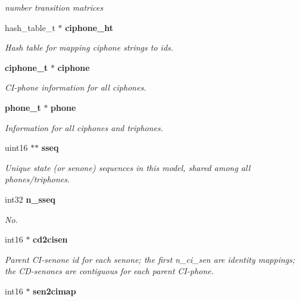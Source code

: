 \begin{DoxyCompactItemize}
\begin{DoxyCompactList}\small\item\em number transition matrices \end{DoxyCompactList}\item 
hash\-\_\-table\-\_\-t $\ast$ {\bf ciphone\-\_\-ht}\label{structmdef__t_a1091b9f34193255ccf6038d75523187b}

\begin{DoxyCompactList}\small\item\em Hash table for mapping ciphone strings to ids. \end{DoxyCompactList}\item 
{\bf ciphone\-\_\-t} $\ast$ {\bf ciphone}\label{structmdef__t_aae4a51202b87f71394b6c5b3138b77c7}

\begin{DoxyCompactList}\small\item\em C\-I-\/phone information for all ciphones. \end{DoxyCompactList}\item 
{\bf phone\-\_\-t} $\ast$ {\bf phone}\label{structmdef__t_a2b9aaf78e5648fe14655d1fe8da5f164}

\begin{DoxyCompactList}\small\item\em Information for all ciphones and triphones. \end{DoxyCompactList}\item 
uint16 $\ast$$\ast$ {\bf sseq}\label{structmdef__t_a2472170a66d451d2d4873a9a6e64adc7}

\begin{DoxyCompactList}\small\item\em Unique state (or senone) sequences in this model, shared among all phones/triphones. \end{DoxyCompactList}\item 
int32 {\bf n\-\_\-sseq}
\begin{DoxyCompactList}\small\item\em No. \end{DoxyCompactList}\item 
int16 $\ast$ {\bf cd2cisen}\label{structmdef__t_ae2ba90b39a79603022daae3c9270a0b7}

\begin{DoxyCompactList}\small\item\em Parent C\-I-\/senone id for each senone; the first n\-\_\-ci\-\_\-sen are identity mappings; the C\-D-\/senones are contiguous for each parent C\-I-\/phone. \end{DoxyCompactList}\item 
int16 $\ast$ {\bf sen2cimap}\label{structmdef__t_a4aafd791a1e1adaa9b5b28bf0cfbd624}


\end{DoxyCompactItemize}
